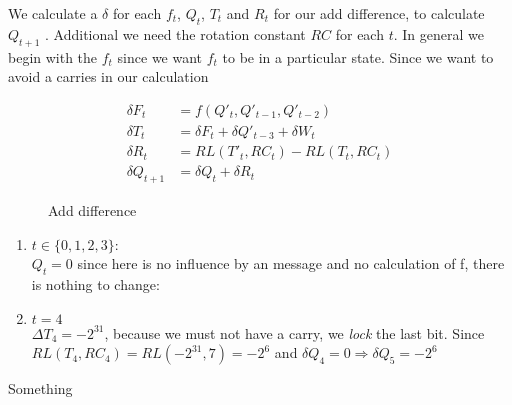 We calculate a $\delta$ for each $f_t$, $Q_t$, $T_t$ and $R_t$ for our add difference, to calculate $Q_{t+1}$ .
Additional we need the rotation constant $RC$ for each $t$. 
In general we begin with the $f_t$ since we want $f_t$ to be in a particular state.
Since we want to avoid a carries in our calculation 

\begin{figure}
    \begin{align*}
        \delta F_t &= f \left( Q'_t,Q'_{t-1},Q'_{t-2} \right) \\
        \delta T_t &= \delta F_t + \delta  Q'_{t-3} + \delta W_t \\
        \delta R_t &=  RL \left(T'_t,RC_t \right) - RL \left(T_t,RC_t \right)\\
        \delta Q_{t+1} &= \delta Q_t + \delta R_t
    \end{align*}
    \caption[short]{Add difference}
    \label{md5delta}
\end{figure}

\begin{enumerate}
    \item $t \in \{0,1,2,3\}$:\\
     $Q_t = 0 $ since here is no influence by an message and no calculation of f, there is nothing to change:
    \item $t = 4$\\
    $\Delta T_4 = -2^{31}$, because we must not have a carry, we \textit{lock} the last bit.
    Since  $RL(T_4, RC_4) = RL(-2^{31}, 7) = -2^6 $ and $\delta Q_4 = 0 \Rightarrow  \delta Q_5 = -2^6$  
\end{enumerate}
Something\\
\newpage
